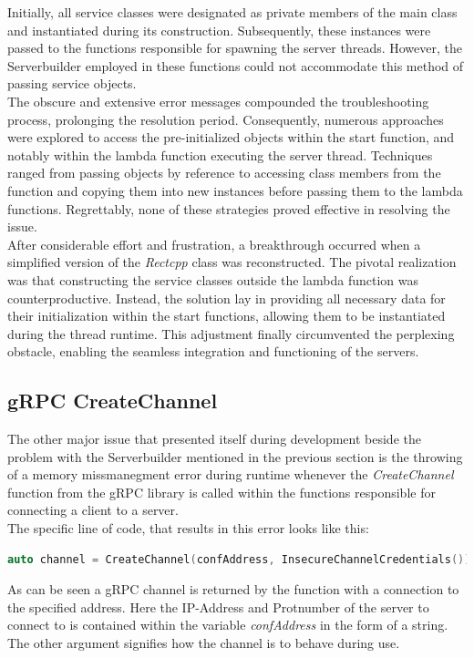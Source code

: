 Initially, all service classes were designated as private members of the main class and instantiated during its construction. Subsequently, these instances were 
passed to the functions responsible for spawning the server threads. However, the Serverbuilder employed in these functions could not accommodate this method of 
passing service objects.\\

The obscure and extensive error messages compounded the troubleshooting process, prolonging the resolution period. Consequently, numerous approaches were explored 
to access the pre-initialized objects within the start function, and notably within the lambda function executing the server thread. Techniques ranged from passing 
objects by reference to accessing class members from the function and copying them into new instances before passing them to the lambda functions. Regrettably, none 
of these strategies proved effective in resolving the issue. \\

After considerable effort and frustration, a breakthrough occurred when a simplified version of the \textit{Rectcpp} class was reconstructed. The pivotal realization was that 
constructing the service classes outside the lambda function was counterproductive. Instead, the solution lay in providing all necessary data for their initialization 
within the start functions, allowing them to be instantiated during the thread runtime. This adjustment finally circumvented the perplexing obstacle, enabling the 
seamless integration and functioning of the servers.\\

\subsection{gRPC CreateChannel}
The other major issue that presented itself during development beside the problem with the Serverbuilder mentioned in the previous section is the throwing of a 
memory missmanegment error during runtime whenever the \textit{CreateChannel} function from the gRPC library is called within the functions responsible for 
connecting a client to a server. \\

The specific line of code, that results in this error looks like this:
\begin{lstlisting}[language=c++]
  auto channel = CreateChannel(confAddress, InsecureChannelCredentials());
\end{lstlisting}
As can be seen a gRPC channel is returned by the function with a connection to the specified address. Here the IP-Address and Protnumber of the server to connect to
is contained within the variable \textit{confAddress} in the form of a string. The other argument signifies how the channel is to behave during use. \\

